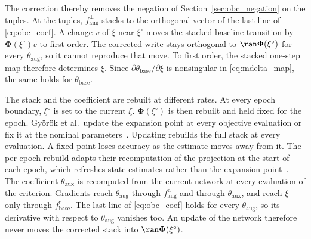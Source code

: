The correction thereby removes the negation of
Section~\ref{sec:obc_negation} on the tuples.
At the tuples, $f^{\perp}_{\mathrm{aug}}$ stacks to the orthogonal vector of
the last line of \eqref{eq:obc_coef}.
A change $v$ of $\xi$ near $\xi^\circ$ moves the stacked baseline transition
by $\boldsymbol\Phi(\xi^\circ)v$ to first order.
The corrected write stays orthogonal to $\ran\boldsymbol\Phi(\xi^\circ)$ for
every $\theta_{\mathrm{aug}}$, so it cannot reproduce that move.
To first order, the stacked one-step map therefore determines $\xi$.
Since $\partial\theta_{\mathrm{base}}/\partial\xi$ is nonsingular in
\eqref{eq:mdelta_map}, the same holds for $\theta_{\mathrm{base}}$.

The stack and the coefficient are rebuilt at different rates.
At every epoch boundary, $\xi^\circ$ is set to the current $\xi$.
$\boldsymbol\Phi(\xi^\circ)$ is then rebuilt and held fixed for the epoch.
Gy\"or\"ok et al.\ update the expansion point at every objective evaluation or
fix it at the nominal parameters~\cite[Sec.~4]{gyorok2025l4dc}.
Updating rebuilds the full stack at every evaluation.
A fixed point loses accuracy as the estimate moves away from it.
The per-epoch rebuild adapts their recomputation of the projection at the
start of each epoch, which refreshes state estimates rather than the
expansion point~\cite[Remark~2]{gyorok2025l4dc}.
The coefficient $\theta_{\mathrm{aux}}$ is recomputed from the current
network at every evaluation of the criterion.
Gradients reach $\theta_{\mathrm{aug}}$ through $f^{\mathrm n}_{\mathrm{aug}}$
and through $\theta_{\mathrm{aux}}$, and reach $\xi$ only through
$f^{\mathrm n}_{\mathrm{base}}$.
The last line of \eqref{eq:obc_coef} holds for every $\theta_{\mathrm{aug}}$,
so its derivative with respect to $\theta_{\mathrm{aug}}$ vanishes too.
An update of the network therefore never moves the corrected stack into
$\ran\boldsymbol\Phi(\xi^\circ)$.

